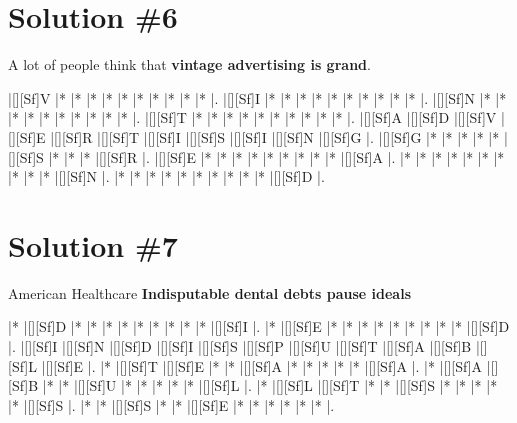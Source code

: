 \documentclass[letterpaper]{article}
\begin{document}
\newpage
\section*{Solution \#6}
A lot of people think that \textbf{vintage advertising is grand}.

\vspace*{1em}
\begin{Puzzle}{11}{9}
|[][Sf]V  |*        |*        |*        |*        |*        |*        |*        |*        |*        |*        |. 
|[][Sf]I  |*        |*        |*        |*        |*        |*        |*        |*        |*        |*        |.  
|[][Sf]N  |*        |*        |*        |*        |*        |*        |*        |*        |*        |*        |.
|[][Sf]T  |*        |*        |*        |*        |*        |*        |*        |*        |*        |*        |.  
|[][Sf]A  |[][Sf]D  |[][Sf]V  |[][Sf]E  |[][Sf]R  |[][Sf]T  |[][Sf]I  |[][Sf]S  |[][Sf]I  |[][Sf]N  |[][Sf]G  |.
|[][Sf]G  |*        |*        |*        |*        |*        |[][Sf]S  |*        |*        |*        |[][Sf]R  |. 
|[][Sf]E  |*        |*        |*        |*        |*        |*        |*        |*        |*        |[][Sf]A  |.
|*        |*        |*        |*        |*        |*        |*        |*        |*        |*        |[][Sf]N  |.
|*        |*        |*        |*        |*        |*        |*        |*        |*        |*        |[][Sf]D  |.
\end{Puzzle}

\newpage
\section*{Solution \#7}
American Healthcare
\newline\textbf{Indisputable dental debts pause ideals}

\vspace*{1em}
\begin{Puzzle}{12}{7}
|*        |[][Sf]D  |*        |*        |*        |*        |*        |*        |*        |*        |*        |[][Sf]I  |.
|*        |[][Sf]E  |*        |*        |*        |*        |*        |*        |*        |*        |*        |[][Sf]D  |.  
|[][Sf]I  |[][Sf]N  |[][Sf]D  |[][Sf]I  |[][Sf]S  |[][Sf]P  |[][Sf]U  |[][Sf]T  |[][Sf]A  |[][Sf]B  |[][Sf]L  |[][Sf]E  |.
|*        |[][Sf]T  |[][Sf]E  |*        |*        |[][Sf]A  |*        |*        |*        |*        |*        |[][Sf]A  |. 
|*        |[][Sf]A  |[][Sf]B  |*        |*        |[][Sf]U  |*        |*        |*        |*        |*        |[][Sf]L  |.
|*        |[][Sf]L  |[][Sf]T  |*        |*        |[][Sf]S  |*        |*        |*        |*        |*        |[][Sf]S  |.
|*        |*        |[][Sf]S  |*        |*        |[][Sf]E  |*        |*        |*        |*        |*        |*        |.
\end{Puzzle}
\end{document}
